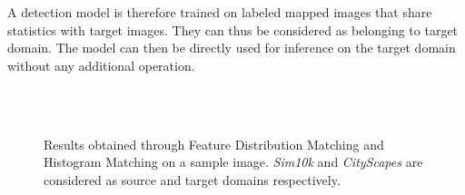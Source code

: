 \documentclass[%
    corpo=12pt,
    twoside,
    stile=classica,   
    tipotesi=magistrale,
    evenboxes,
    english,
	numerazioneromana,
]{toptesi}
\begin{document}
A detection model is therefore trained on labeled mapped images that share statistics with target images. They can thus be considered as belonging to target domain. The model can then be directly used for inference on the target domain without any additional operation.

\begin{figure}[ht]
	\centering
	\\
	\\
	\caption{Results obtained through Feature Distribution Matching and Histogram Matching on a sample image. \textit{Sim10k} and \textit{CityScapes} are considered as source and target domains respectively.}
	\label{fig:kis}
\end{figure}
\end{document}
